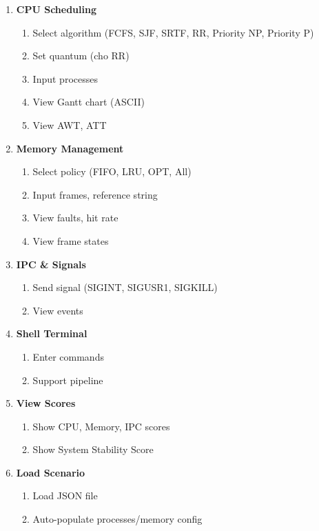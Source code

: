 \begin{enumerate}[leftmargin=1.5cm]
  \item \textbf{CPU Scheduling}
  \begin{enumerate}
    \item Select algorithm (FCFS, SJF, SRTF, RR, Priority NP, Priority P)
    \item Set quantum (cho RR)
    \item Input processes
    \item View Gantt chart (ASCII)
    \item View AWT, ATT
  \end{enumerate}
  
  \item \textbf{Memory Management}
  \begin{enumerate}
    \item Select policy (FIFO, LRU, OPT, All)
    \item Input frames, reference string
    \item View faults, hit rate
    \item View frame states
  \end{enumerate}
  
  \item \textbf{IPC \& Signals}
  \begin{enumerate}
    \item Send signal (SIGINT, SIGUSR1, SIGKILL)
    \item View events
  \end{enumerate}
  
  \item \textbf{Shell Terminal}
  \begin{enumerate}
    \item Enter commands
    \item Support pipeline
  \end{enumerate}
  
  \item \textbf{View Scores}
  \begin{enumerate}
    \item Show CPU, Memory, IPC scores
    \item Show System Stability Score
  \end{enumerate}
  
  \item \textbf{Load Scenario}
  \begin{enumerate}
    \item Load JSON file
    \item Auto-populate processes/memory config
  \end{enumerate}
\end{enumerate}

